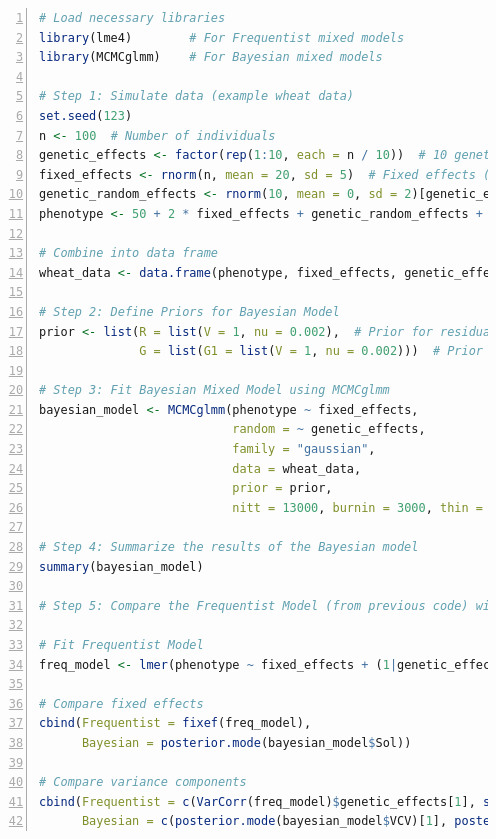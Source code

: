 \documentclass[12pt,a4paper]{article}
\begin{document}
\begin{lstlisting}[language=R, 
                   caption=Basic MCMCglmm Model for Genetic Analysis,
                   basicstyle=\ttfamily\footnotesize,
                   keywordstyle=\color{blue},
                   stringstyle=\color{red},
                   commentstyle=\color{green!60!black},
                   numbers=left,
                   numberstyle=\tiny\color{gray},
                   frame=single,
                   breaklines=true,
                   linewidth=0.95\textwidth,
                   columns=flexible,
                   xleftmargin=0.05\textwidth,
                   xrightmargin=0.05\textwidth]
# Load necessary libraries
library(lme4)        # For Frequentist mixed models
library(MCMCglmm)    # For Bayesian mixed models

# Step 1: Simulate data (example wheat data)
set.seed(123)
n <- 100  # Number of individuals
genetic_effects <- factor(rep(1:10, each = n / 10))  # 10 genetic groups
fixed_effects <- rnorm(n, mean = 20, sd = 5)  # Fixed effects (e.g., environmental)
genetic_random_effects <- rnorm(10, mean = 0, sd = 2)[genetic_effects]  # Random genetic effects
phenotype <- 50 + 2 * fixed_effects + genetic_random_effects + rnorm(n, sd = 3)  # Phenotype

# Combine into data frame
wheat_data <- data.frame(phenotype, fixed_effects, genetic_effects)

# Step 2: Define Priors for Bayesian Model
prior <- list(R = list(V = 1, nu = 0.002),  # Prior for residuals
              G = list(G1 = list(V = 1, nu = 0.002)))  # Prior for random genetic effects

# Step 3: Fit Bayesian Mixed Model using MCMCglmm
bayesian_model <- MCMCglmm(phenotype ~ fixed_effects, 
                           random = ~ genetic_effects, 
                           family = "gaussian", 
                           data = wheat_data, 
                           prior = prior,
                           nitt = 13000, burnin = 3000, thin = 10)

# Step 4: Summarize the results of the Bayesian model
summary(bayesian_model)

# Step 5: Compare the Frequentist Model (from previous code) with Bayesian model

# Fit Frequentist Model
freq_model <- lmer(phenotype ~ fixed_effects + (1|genetic_effects), data = wheat_data)

# Compare fixed effects
cbind(Frequentist = fixef(freq_model), 
      Bayesian = posterior.mode(bayesian_model$Sol))

# Compare variance components
cbind(Frequentist = c(VarCorr(freq_model)$genetic_effects[1], sigma(freq_model)^2), 
      Bayesian = c(posterior.mode(bayesian_model$VCV)[1], posterior.mode(bayesian_model$VCV)[2]))

\end{lstlisting}
\end{document}
